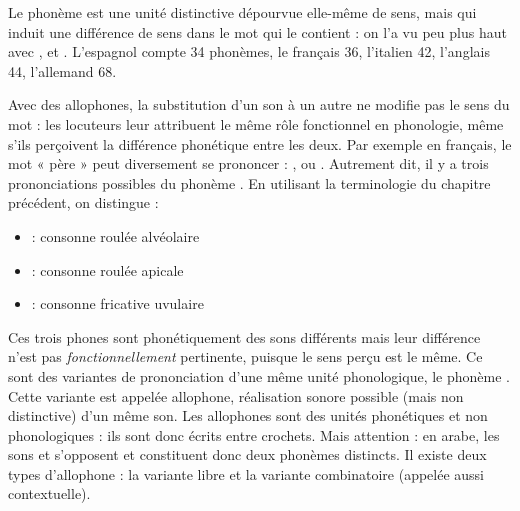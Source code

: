 Le phonème est une unité distinctive dépourvue elle-même de sens, mais qui induit une différence de sens dans le mot qui le contient : on l’a vu peu plus haut avec \bipa{[bato]}, \bipa{[rato]} et \bipa{[gato]}. L’espagnol compte 34 phonèmes, le français 36, l’italien 42, l’anglais 44, l’allemand 68.

Avec des allophones, la substitution d’un son à un autre ne modifie pas le sens du mot : les locuteurs leur attribuent le même rôle fonctionnel en phonologie, même s’ils perçoivent la différence phonétique entre les deux. Par exemple en français, le mot « père » peut diversement se prononcer : \bipa{[pɛr]}, \bipa{[pɛʀ]} ou \bipa{[pɛʁ]}. Autrement dit, il y a trois prononciations possibles du phonème . En utilisant la terminologie du chapitre précédent, on distingue :
\begin{itemize}
\item \bipa{[r]} : consonne roulée alvéolaire
\item \bipa{[ʀ]} : consonne roulée apicale
\item \bipa{[ʁ]} : consonne fricative uvulaire
\end{itemize}
Ces trois phones sont phonétiquement des sons différents mais leur différence n’est pas \textit{fonctionnellement} pertinente, puisque le sens perçu est le même. Ce sont des variantes de prononciation d’une même unité phonologique, le phonème . Cette variante est appelée allophone, réalisation sonore possible (mais non distinctive) d’un même son. Les allophones sont des unités phonétiques et non phonologiques : ils sont donc écrits entre crochets. Mais attention : en arabe, les sons \bipa{[r]} et \bipa{[ʀ]} s’opposent et constituent donc deux phonèmes distincts. Il existe deux types d’allophone : la variante libre et la variante combinatoire (appelée aussi contextuelle).

